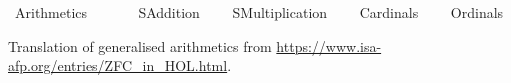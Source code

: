 %
\begin{isabellebody}%
%
%
\isadelimtheory
%
\endisadelimtheory
%
\isatagtheory
\isanewline
\isanewline
{}\isamarkupfalse%
\ Arithmetics\isanewline
\ \ \isanewline
\ \ \ \ SAddition\isanewline
\ \ \ \ SMultiplication\isanewline
\ \ \ \ Cardinals\isanewline
\ \ \ \ Ordinals\isanewline
{}%
\endisatagtheory
{\isafoldtheory}%
%
\isadelimtheory
%
\endisadelimtheory
%
\isadelimdocument
%
\endisadelimdocument
%
\isatagdocument
%
\isamarkuptrue%
%
\endisatagdocument
{\isafolddocument}%
%
\isadelimdocument
%
\endisadelimdocument
%
\begin{isamarkuptext}%
Translation of generalised arithmetics from
 \url{https://www.isa-afp.org/entries/ZFC_in_HOL.html}.%
\end{isamarkuptext}\isamarkuptrue%
%
\isadelimtheory
%
\endisadelimtheory
%
\isatagtheory
{}\isamarkupfalse%
%
\endisatagtheory
{\isafoldtheory}%
%
\isadelimtheory
%
\endisadelimtheory
%
\end{isabellebody}%
\endinput
